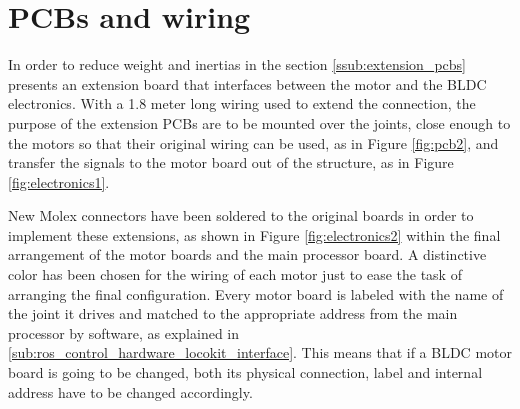\section{PCBs and wiring} %
\label{sec:pcbs_and_wiring}
In order to reduce weight and inertias in the section \ref{ssub:extension_pcbs} presents an extension board that interfaces between the motor and the BLDC electronics.
With a 1.8 meter long wiring used to extend the connection, the purpose of the extension PCBs are to be mounted over the joints, close enough to the motors so that their original wiring can be used, as in Figure \ref{fig:pcb2}, and transfer the signals to the motor board out of the structure, as in Figure \ref{fig:electronics1}.

New Molex connectors have been soldered to the original boards in order to implement these extensions, as shown in Figure \ref{fig:electronics2} within the final arrangement of the motor boards and the main processor board.
A distinctive color has been chosen for the wiring of each motor just to ease the task of arranging the final configuration.
Every motor board is labeled with the name of the joint it drives and matched to the appropriate address from the main processor by software, as explained in \ref{sub:ros_control_hardware_locokit_interface}.
This means that if a BLDC motor board is going to be changed, both its physical connection, label and internal address have to be changed accordingly.


